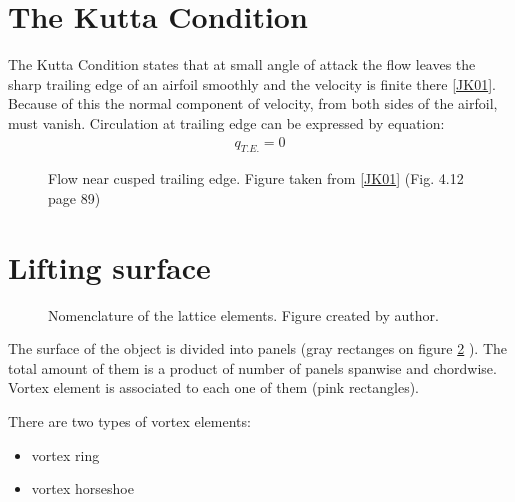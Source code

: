\documentclass[letterpaper,10pt,english]{jupyterBook}
\let\sphinxpxdimen\pdfpxdimen\else\newdimen\sphinxpxdimen
\begin{document}
\section{The Kutta Condition}
\label{\detokenize{chapters/description/theory:the-kutta-condition}}
\sphinxAtStartPar
The Kutta Condition states that at small angle of attack the flow leaves the sharp trailing edge of an airfoil smoothly and the velocity is finite there {[}\hyperlink{cite.chapters/bibliography:id3}{JK01}{]}. Because of this the normal component of velocity, from both sides of the airfoil, must vanish. Circulation at trailing edge can be expressed by equation:
\begin{equation*}
\begin{split}
q_{T.E.}=0
\end{split}
\end{equation*}
\begin{figure}[htbp]
\centering
\capstart

\noindent{}
\caption{Flow near cusped trailing edge. Figure taken from {[}\hyperlink{cite.chapters/bibliography:id3}{JK01}{]} (Fig. 4.12 page 89)}\label{\detokenize{chapters/description/theory:kutta}}\end{figure}


\section{Lifting surface}
\label{\detokenize{chapters/description/theory:lifting-surface}}
\begin{figure}[htbp]
\centering
\capstart

\noindent\sphinxincludegraphics[height=300\sphinxpxdimen]{{siatka}.png}
\caption{Nomenclature of the lattice elements. Figure created by author.}\label{\detokenize{chapters/description/theory:siatka}}\end{figure}

\sphinxAtStartPar
The surface of the object is divided into panels (gray rectanges on figure \hyperref[\detokenize{chapters/description/theory:siatka}]{\ref{\detokenize{chapters/description/theory:siatka}}} ). The total amount of them is a product of number of panels spanwise and chordwise. Vortex element is associated to each one of them (pink rectangles).

\sphinxAtStartPar
There are two types of vortex elements:
\begin{itemize}
\item {} 
\sphinxAtStartPar
vortex ring

\item {} 
\sphinxAtStartPar
vortex horseshoe

\end{itemize}
\end{document}
